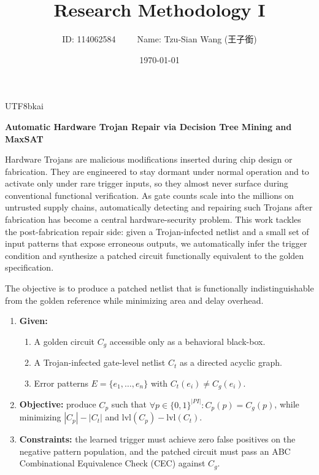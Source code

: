 \documentclass[a4paper,12pt]{article}
\begin{document}
\begin{CJK}{UTF8}{bkai}
\title{\bf Research Methodology I}
\date{\today}
\author{ID: 114062584\ \ \ \ \ Name: Tzu-Sian Wang (王子銜)}
\maketitle
\begin{center}
\textbf{Automatic Hardware Trojan Repair via Decision Tree Mining and MaxSAT}
\end{center}
\end{CJK}

\vspace{0.1cm} {\fontsize{16pt}{20pt}\selectfont {}}

\quad

Hardware Trojans are malicious modifications inserted during chip design or fabrication. They are engineered to stay dormant under normal operation and to activate only under rare trigger inputs, so they almost never surface during conventional functional verification. As gate counts scale into the millions on untrusted supply chains, automatically detecting and repairing such Trojans after fabrication has become a central hardware-security problem. This work tackles the post-fabrication repair side: given a Trojan-infected netlist and a small set of input patterns that expose erroneous outputs, we automatically infer the trigger condition and synthesize a patched circuit functionally equivalent to the golden specification.

\vspace{0.1cm} {\fontsize{16pt}{20pt}\selectfont {}}

\quad

The objective is to produce a patched netlist that is functionally indistinguishable from the golden reference while minimizing area and delay overhead.
\begin{enumerate}
    \item \textbf{Given:}
    \begin{enumerate}
        \item A golden circuit $C_g$ accessible only as a behavioral black-box.
        \item A Trojan-infected gate-level netlist $C_t$ as a directed acyclic graph.
        \item Error patterns $E = \{e_1,\dots,e_n\}$ with $C_t(e_i) \neq C_g(e_i)$.
    \end{enumerate}
    \item \textbf{Objective:} produce $C_p$ such that $\forall p \in \{0,1\}^{|PI|}: C_p(p) = C_g(p)$, while minimizing $|C_p|-|C_t|$ and $\text{lvl}(C_p)-\text{lvl}(C_t)$.
    \item \textbf{Constraints:} the learned trigger must achieve zero false positives on the negative pattern population, and the patched circuit must pass an ABC Combinational Equivalence Check (CEC) against $C_g$.
\end{enumerate}
\end{document}
